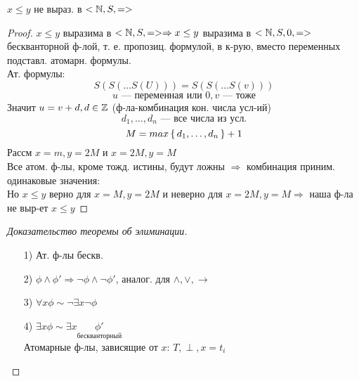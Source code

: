 \begin{consequence}
$x \leq y$ не выраз. в $< \mathbb{N}, S, = >$
\end{consequence}
\begin{proof}
  $x \leq y$ выразима в $< \mathbb{N}, S, = > \Rightarrow x \leq y$ выразима в $< \mathbb{N}, S, 0, = >$ бескванторной ф-лой, т. е. пропозиц. формулой, в к-рую, вместо переменных подставл. атомарн. формулы. \\
  Ат. формулы:
  \[
  S(S(\ldots S(U))) = S(S(\ldots S(v)))
  \]
  \[
  u \text{ --- переменная или $0$}, v \text{ --- тоже}
  \]
  Значит $u = v + d, d \in \mathbb{Z}$ (ф-ла-комбинация кон. числа усл-ий)
  \[
  d_1, \ldots, d_n \text{ --- все числа из усл.}
  \]
  \[
  M  = max\set{d_1, \ldots, d_n} + 1
  \]
  Рассм $x = m, y = 2M$ и $x = 2M, y = M$ \\
  Все атом. ф-лы, кроме тожд. истины, будут ложны $\Rightarrow$ комбинация приним. одинаковые значения: \\
  Но $x \leq y$ верно для $x = M, y = 2M$ и неверно для $x = 2M, y = M \Rightarrow$ наша ф-ла не выр-ет $x \leq y$
\end{proof}
\begin{proof}[Доказательство теоремы об элиминации]
\begin{itemize}
  \item [1) ] Ат. ф-лы бескв.
  \item [2) ] $\phi \land \phi' \Rightarrow \neg \phi \land \neg \phi'$, аналог. для $\land, \lor, \rightarrow$
  \item [3) ] $\forall x \phi \sim \neg \exists x \neg \phi$
  \item [4) ] $\exists x \phi \sim \exists x \underset{\text{бескванторный}}{\phi'}$ \\
    Атомарные ф-лы, зависящие от $x$: $T, \perp, x = t_i$
\end{itemize}
\end{proof}

